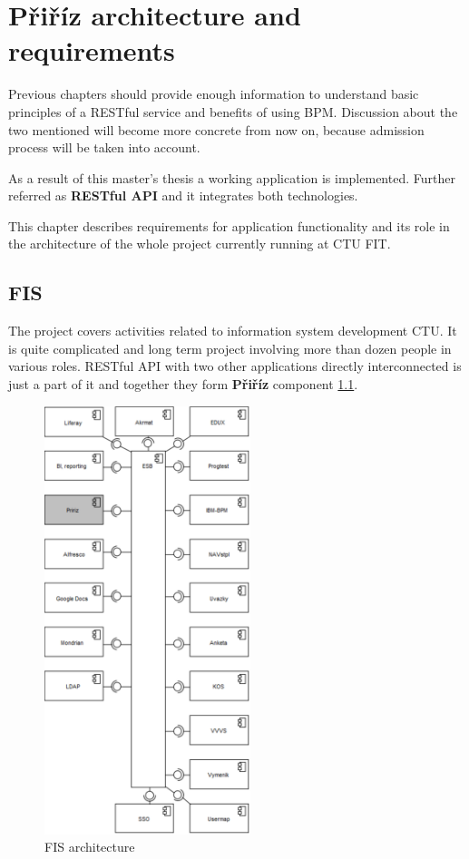 \chapter{Přiříz architecture and requirements}\label{cha:architecture}

	Previous chapters should provide enough information to understand basic principles of a RESTful service and benefits of
	using BPM. Discussion about the two mentioned will become more concrete from now on, because admission process will be
	taken into account.
	
	As a result of this master's thesis a working application is implemented. Further referred as \textbf{RESTful API} and
	it integrates both technologies.
	 	
	This chapter describes requirements for application functionality and its role in the architecture of the whole project
	currently running at CTU FIT.

	\section{\gls{FIS}}
	
	The project covers activities related to information system development CTU. It is quite complicated and long term
	project involving more than dozen people in various roles. RESTful API with two other applications directly
	interconnected is just a part of it and together they form \textbf{Přiříz} component \ref{fig:fis_architecture}.
	
	\newpage
	\begin{figure}[h]
		\label{fig:fis_architecture}
	  	\centering
	    \includegraphics[width=6cm]{figures/fis_architecture}
	  	\caption{FIS architecture}
	\end{figure}
	
